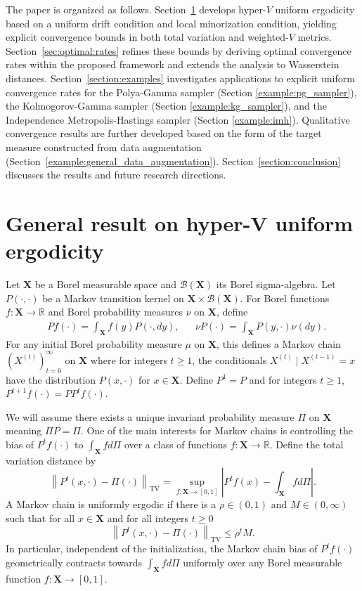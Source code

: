 \documentclass[ejsv2, noshowframe]{imsart}
\theoremstyle{plain}
\theoremstyle{definition}
\theoremstyle{remark}
\newcommand{\norm}[1]{\left\lVert#1\right\rVert}
\newcommand{\R}{\mathbb{R}}
\renewcommand{\P}{P}
\newcommand{\X}{\textbf{X}}
\newcommand{\B}{\mathcal{B}}
\begin{document}
The paper is organized as follows.
Section~\ref{section:general_results} develops hyper-$V$ uniform ergodicity based on a uniform drift condition and local minorization condition, yielding explicit convergence bounds in both total variation and weighted-$V$ metrics. Section~\ref{sec:optimal:rates} refines these bounds by deriving optimal convergence rates within the proposed framework and extends the analysis to Wasserstein distances. 
Section~\ref{section:examples} investigates applications to explicit uniform convergence rates for the Polya-Gamma sampler (Section \ref{example:pg_sampler}), the Kolmogorov-Gamma sampler (Section \ref{example:kg_sampler}), and the Independence Metropolis-Hastings sampler (Section \ref{example:imh}). Qualitative convergence results are further developed based on the form of the target measure constructed from data augmentation (Section~\ref{example:general_data_augmentation}). Section~\ref{section:conclusion} discusses the results and future research directions.


\section{General result on hyper-V uniform ergodicity}
\label{section:general_results}

Let $\X$ be a Borel measurable space and $\B(\X)$ its Borel sigma-algebra.
Let $\P(\cdot, \cdot)$ be a Markov transition kernel on $\X \times \B(\X)$.
For Borel functions $f : \X \to \R$ and Borel probability measures $\nu$ on $\X$, define
\begin{align*}
&\P f(\cdot) = \int_{\X} f(y) \P(\cdot, dy), 
&&\nu \P( \cdot ) = \int_{\X} \P(y, \cdot) \nu(dy).
\end{align*}
For any initial Borel probability measure $\mu$ on $\X$, this defines a Markov chain $(X^{(t)})_{t = 0}^{\infty}$ on $\X$ where for integers $t \ge 1$, the conditionals $X^{(t)} \mid X^{(t-1)} = x$ have the distribution $\P(x, \cdot )$ for $x \in \X$.
Define $\P^1 = \P$ and for integers $t \ge 1$, $\P^{t + 1}f(\cdot) = \P \P^t f(\cdot)$.

We will assume there exists a unique invariant probability measure $\Pi$ on $\X$ meaning $\Pi P = \Pi$.
One of the main interests for Markov chains is controlling the bias of $\P^t f(\cdot)$ to $\int_{\X} f d\Pi$ over a class of functions $f : \X \to \R$.
Define the total variation distance by
\[
\norm{\P^t(x, \cdot) - \Pi(\cdot)}_{\mathrm{TV}}
= \sup_{ f : \X \to [0, 1]} \left| \P^tf(x) - \int_{\X} f d\Pi \right|.
\]
A Markov chain is uniformly ergodic if there is a $\rho \in (0, 1)$ and $M \in (0, \infty)$ such that for all $x \in \X$ and for all integers $t \ge 0$
\[
\norm{\P^t(x, \cdot) - \Pi(\cdot)}_{\mathrm{TV}}
\le \rho^t M.
\]
In particular, independent of the initialization, the Markov chain bias of $\P^t f (\cdot)$ geometrically contracts towards $\int_{\X} f d\Pi$ uniformly over any Borel measurable function $f : \X \to [0, 1]$.
\end{document}

